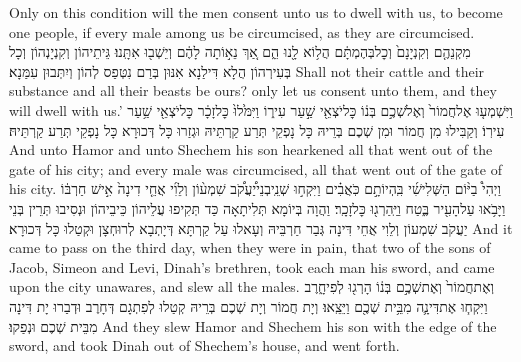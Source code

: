 {Only on this condition will the men consent unto us to dwell with us, to become one people, if every male among us be circumcised, as they are circumcised.}{}
{מִקְנֵהֶ֤ם וְקִנְיָנָם֙ וְכׇל\maqqaf בְּהֶמְתָּ֔ם הֲל֥וֹא לָ֖נוּ הֵ֑ם אַ֚ךְ נֵא֣וֹתָה לָהֶ֔ם וְיֵשְׁב֖וּ אִתָּֽנוּ׃}
{גֵּיתֵיהוֹן וְקִנְיָנְהוֹן וְכָל בְּעִירְהוֹן הֲלָא דִּילַנָא אִנּוּן בְּרַם נִטְּפַס לְהוֹן וְיִתְּבוּן עִמַּנָא׃}
{Shall not their cattle and their substance and all their beasts be ours? only let us consent unto them, and they will dwell with us.’}{}
{וַיִּשְׁמְע֤וּ אֶל\maqqaf חֲמוֹר֙ וְאֶל\maqqaf שְׁכֶ֣ם בְּנ֔וֹ כׇּל\maqqaf יֹצְאֵ֖י שַׁ֣עַר עִיר֑וֹ וַיִּמֹּ֙לוּ֙ כׇּל\maqqaf זָכָ֔ר כׇּל\maqqaf יֹצְאֵ֖י שַׁ֥עַר עִירֽוֹ׃}
{וְקַבִּילוּ מִן חֲמוֹר וּמִן שְׁכֶם בְּרֵיהּ כָּל נָפְקֵי תְּרַע קַרְתֵּיהּ וּגְזַרוּ כָּל דְּכוּרָא כָּל נָפְקֵי תְּרַע קַרְתֵּיהּ׃}
{And unto Hamor and unto Shechem his son hearkened all that went out of the gate of his city; and every male was circumcised, all that went out of the gate of his city.}{}
{וַיְהִי֩ בַיּ֨וֹם הַשְּׁלִישִׁ֜י בִּֽהְיוֹתָ֣ם כֹּֽאֲבִ֗ים וַיִּקְח֣וּ שְׁנֵֽי\maqqaf בְנֵי\maqqaf יַ֠עֲקֹ֠ב שִׁמְע֨וֹן וְלֵוִ֜י אֲחֵ֤י דִינָה֙ אִ֣ישׁ חַרְבּ֔וֹ וַיָּבֹ֥אוּ עַל\maqqaf הָעִ֖יר בֶּ֑טַח וַיַּֽהַרְג֖וּ כׇּל\maqqaf זָכָֽר׃}
{וַהֲוָה בְּיוֹמָא תְּלִיתָאָה כַּד תְּקִיפוּ עֲלֵיהוֹן כֵּיבֵיהוֹן וּנְסִיבוּ תְּרֵין בְּנֵי יַעֲקֹב שִׁמְעוֹן וְלֵוִי אֲחֵי דִּינָה גְּבַר חַרְבֵּיהּ וְעָאלוּ עַל קַרְתָּא דְּיָתְבָא לְרוּחְצָן וּקְטַלוּ כָּל דְּכוּרָא׃}
{And it came to pass on the third day, when they were in pain, that two of the sons of Jacob, Simeon and Levi, Dinah’s brethren, took each man his sword, and came upon the city unawares, and slew all the males.}{}
{וְאֶת\maqqaf חֲמוֹר֙ וְאֶת\maqqaf שְׁכֶ֣ם בְּנ֔וֹ הָרְג֖וּ לְפִי\maqqaf חָ֑רֶב וַיִּקְח֧וּ אֶת\maqqaf דִּינָ֛ה מִבֵּ֥ית שְׁכֶ֖ם וַיֵּצֵֽאוּ׃}
{וְיָת חֲמוֹר וְיָת שְׁכֶם בְּרֵיהּ קְטַלוּ לְפִתְגָם דְּחָרֶב וּדְבַרוּ יָת דִּינָה מִבֵּית שְׁכֶם וּנְפַקוּ׃}
{And they slew Hamor and Shechem his son with the edge of the sword, and took Dinah out of Shechem’s house, and went forth.}{}
